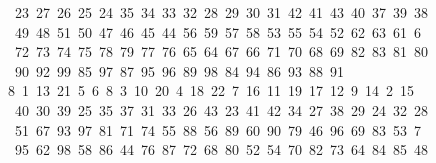 \begin{tabbing}
\>\ 23\ 27\ 26\ 25\ 24\ 35\ 34\ 33\ 32\ 28\ 29\ 30\ 31\ 42\ 41\ 43\ 40\ 37\ 39\ 38\ \\[0pt]
\ 49\ 48\ 51\ 50\ 47\ 46\ 45\ 44\ 56\ 59\ 57\ 58\ 53\ 55\ 54\ 52\ 62\ 63\ 61\ 6\\[0pt]
\ 72\ 73\ 74\ 75\ 78\ 79\ 77\ 76\ 65\ 64\ 67\ 66\ 71\ 70\ 68\ 69\ 82\ 83\ 81\ 80\\[0pt]
\>\ 90\ 92\ 99\ 85\ 97\ 87\ 95\ 96\ 89\ 98\ 84\ 94\ 86\ 93\ 88\ 91\\[0pt]
8\ 1\ 13\ 21\ 5\ 6\ 8\ 3\ 10\ 20\ 4\ 18\ 22\ 7\ 16\ 11\ 19\ 17\ 12\ 9\ 14\ 2\ 15\\[0pt]
\>\ 40\ 30\ 39\ 25\ 35\ 37\ 31\ 33\ 26\ 43\ 23\ 41\ 42\ 34\ 27\ 38\ 29\ 24\ 32\ 28\ \\[0pt]
\ 51\ 67\ 93\ 97\ 81\ 71\ 74\ 55\ 88\ 56\ 89\ 60\ 90\ 79\ 46\ 96\ 69\ 83\ 53\ 7\\[0pt]
\ 95\ 62\ 98\ 58\ 86\ 44\ 76\ 87\ 72\ 68\ 80\ 52\ 54\ 70\ 82\ 73\ 64\ 84\ 85\ 48\\[0pt]

\end{tabbing}
